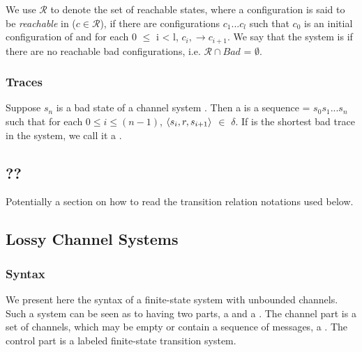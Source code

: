 We use $\mathcal{R}$ to denote the set of reachable states, where a configuration  is said to be \emph{reachable} in  ($c \in \mathcal{R}$), if there are configurations $c_1...c_l$ such that $c_0$ is an initial configuration of  and for each 0 $\leq$ i < l, $c_i, \rightarrow c_{i+1}$.  We say that the system  is  if there are no reachable bad configurations, i.e. $\mathcal{R} \cap Bad$ = $\emptyset$.

\subsubsection{Traces}
\label{traces}

Suppose $s_n$ is a bad state of a channel system . Then a  is a sequence  = $s_0s_1...s_n$ such that for each $0 \leq i \leq (n-1)$, $\langle s_i,r,s_{i+1}\rangle$ $\in$ $\delta$. If  is the shortest bad trace in the system, we call it a . 

\subsection{??}
Potentially a section on how to read the transition relation notations used below.

\subsection{Lossy Channel Systems}
\subsubsection{Syntax}
We present here the syntax of a finite-state system with unbounded channels. Such a system can be seen as to having two parts, a  and a . The channel part is a set of channels, which may be empty or contain a sequence of messages, a . The control part is a labeled finite-state transition system. 

